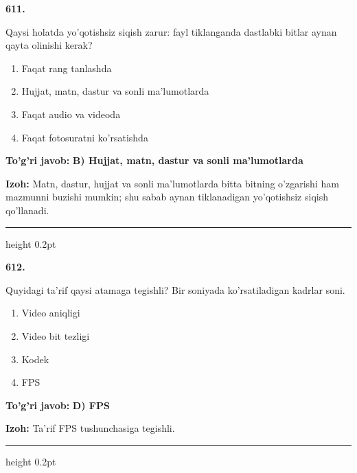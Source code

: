 \documentclass[10pt,a4paper,oneside]{article}
\begin{document}
\noindent\textbf{\color{ink}611.}
\par
Qaysi holatda yo'qotishsiz siqish zarur: fayl tiklanganda dastlabki bitlar aynan qayta olinishi kerak?
\begin{enumerate}[label=\Alph*),leftmargin=9mm]
\item Faqat rang tanlashda
\item Hujjat, matn, dastur va sonli ma'lumotlarda
\item Faqat audio va videoda
\item Faqat fotosuratni ko'rsatishda
\end{enumerate}
\begin{tcolorbox}[enhanced,breakable,colback=teal!4,colframe=teal!50!black,boxrule=0.5pt,arc=1.1mm,left=3mm,right=3mm,top=1.7mm,bottom=1.7mm,before skip=2mm,after skip=2mm]
\textbf{\color{teal}To'g'ri javob:} \textbf{B) Hujjat, matn, dastur va sonli ma'lumotlarda}
\par\smallskip
\textbf{Izoh:} Matn, dastur, hujjat va sonli ma'lumotlarda bitta bitning o'zgarishi ham mazmunni buzishi mumkin; shu sabab aynan tiklanadigan yo'qotishsiz siqish qo'llanadi.
\end{tcolorbox}
\vspace{2mm}\hrule height 0.2pt \vspace{3mm}

\noindent\textbf{\color{ink}612.}
\par
Quyidagi ta'rif qaysi atamaga tegishli? Bir soniyada ko'rsatiladigan kadrlar soni.
\begin{enumerate}[label=\Alph*),leftmargin=9mm]
\item Video aniqligi
\item Video bit tezligi
\item Kodek
\item FPS
\end{enumerate}
\begin{tcolorbox}[enhanced,breakable,colback=teal!4,colframe=teal!50!black,boxrule=0.5pt,arc=1.1mm,left=3mm,right=3mm,top=1.7mm,bottom=1.7mm,before skip=2mm,after skip=2mm]
\textbf{\color{teal}To'g'ri javob:} \textbf{D) FPS}
\par\smallskip
\textbf{Izoh:} Ta'rif FPS tushunchasiga tegishli.
\end{tcolorbox}
\vspace{2mm}\hrule height 0.2pt \vspace{3mm}
\end{document}
